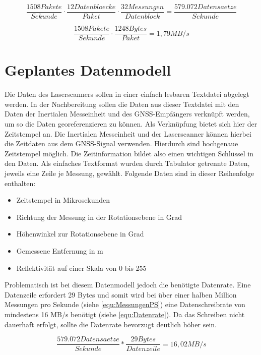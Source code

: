 \documentclass[a4paper,12pt,bibliography=totoc, listof=totoc,titlepage,pointlessnumbers]{scrreprt}
\begin{document}
\begin{equation}
 \frac{1508 Pakete}{Sekunde} \cdot \frac{12 Datenbloecke}{Paket} \cdot
\frac{32 Messungen}{Datenblock} = \frac{579.072 Datensaetze}{Sekunde}
 \label{equ:MessungenPS}
\end{equation}

\begin{equation}
 \frac{1508 Pakete}{Sekunde} \cdot \frac{1248 Bytes}{Paket} = 1,79 MB/s
 \label{equ:Ausgangsrate}
\end{equation}

\section{Geplantes Datenmodell}
\label{s:datenmodell}
Die Daten des Laserscanners sollen in einer einfach lesbaren Textdatei abgelegt werden. In der Nachbereitung sollen die Daten aus dieser Textdatei mit den Daten der Inertialen Messeinheit und des GNSS-Empfängers verknüpft werden, um so die Daten georeferenzieren zu können. Als Verknüpfung bietet sich hier der Zeitstempel an. Die Inertialen Messeinheit und der Laserscanner können hierbei die Zeitdaten aus dem GNSS-Signal verwenden. Hierdurch sind hochgenaue Zeitstempel möglich. Die Zeitinformation bildet also einen wichtigen Schlüssel in den Daten. Als einfaches Textformat wurden durch Tabulator getrennte Daten, jeweils eine Zeile je Messung, gewählt. Folgende Daten sind in dieser Reihenfolge enthalten:

\begin{itemize}
 \item Zeitstempel in Mikrosekunden
 \item Richtung der Messung in der Rotationsebene in Grad
 \item Höhenwinkel zur Rotationsebene in Grad
 \item Gemessene Entfernung in m
 \item Reflektivität auf einer Skala von 0 bis 255
\end{itemize}

Problematisch ist bei diesem Datenmodell jedoch die benötigte Datenrate. Eine Datenzeile erfordert 29 Bytes und somit wird bei über einer halben Million Messungen pro Sekunde (siehe \autoref{equ:MessungenPS}) eine Datenschreibrate von mindestens 16 MB/s benötigt (siehe \autoref{equ:Datenrate}). Da das Schreiben nicht dauerhaft erfolgt, sollte die Datenrate bevorzugt deutlich höher sein.

\begin{equation}
 \frac{579.072 Datensaetze}{Sekunde} * \frac{29 Bytes}{Datenzeile} = 16,02 MB/s
\label{equ:Datenrate}
\end{equation}
\end{document}
